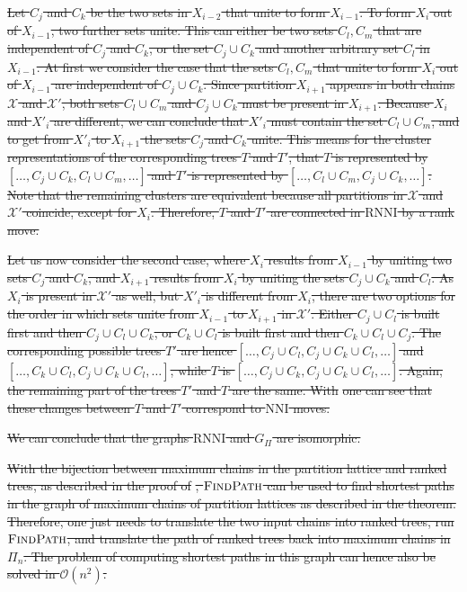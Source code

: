 \documentclass[11pt]{amsart}
\newcommand{\rnni}{\mathrm{RNNI}}
\newcommand{\findpath}{\textsc{FindPath}}
\newcommand{\nni}{\mathrm{NNI}}
\renewcommand{\O}{\mathcal O}
\providecommand{\DIFdeltex}[1]{{\protect\color{red}\sout{#1}}}                      %
\providecommand{\DIFdel}[1]{\texorpdfstring{\DIFdeltex{#1}}{}} %
\begin{document}
\DIFdel{Let $C_j$ and $C_k$ be the two sets in $X_{i-2}$ that unite to form $X_{i-1}$.
	To form $X_i$ out of $X_{i-1}$, two further sets unite.
	This can either be two sets $C_l, C_m$ that are independent of $C_j$ and $C_k$, or the set $C_j \cup C_k$ and another arbitrary set $C_l$ in $X_{i-1}$.
	At first we consider the case that the sets $C_l,C_m$ that unite to form $X_i$ out of $X_{i-1}$ are independent of $C_j \cup C_k$.
	Since partition $X_{i+1}$ appears in both chains $\mathcal X$ and $\mathcal X'$, both sets $C_l \cup C_m$ and $C_j \cup C_k$ must be present in $X_{i+1}$.
	Because $X_i$ and $X'_i$ are different, we can conclude that $X'_i$ must contain the set $C_l \cup C_m$, and to get from $X'_i$ to $X_{i+1}$ the sets $C_j$ and $C_k$ unite.
	This means for the cluster representations of the corresponding trees $T$ and $T'$, that $T$ is represented by $[\ldots, C_j \cup C_k, C_l \cup C_m, \ldots]$ and $T'$ is represented by $[\ldots, C_l \cup C_m, C_j \cup C_k, \ldots]$.
	Note that the remaining clusters are equivalent because all partitions in $\mathcal X$ and $\mathcal X'$ coincide, except for $X_i$.
	Therefore, $T$ and $T'$ are connected in $\rnni$ by a rank move.
}%

\DIFdel{Let us now consider the second case, where $X_i$ results from $X_{i-1}$ by uniting two sets $C_j$ and $C_k$, and $X_{i+1}$ results from $X_i$ by uniting the sets $C_j \cup C_k$ and $C_l$.
	As $X_i$ is present in $\mathcal X'$ as well, but $X'_i$ is different from $X_i$, there are two options for the order in which sets unite from $X_{i-1}$ to $X_{i+1}$ in $\mathcal X'$.
	Either $C_j \cup C_l$ is built first and then $C_j \cup C_l \cup C_k$, or $C_k \cup C_l$ is built first and then $C_k \cup C_l \cup C_j$.
	The corresponding possible trees $T'$ are hence $[\ldots, C_j \cup C_l, C_j \cup C_k \cup C_l, \ldots]$ and $[\ldots, C_k \cup C_l, C_j \cup C_k \cup C_l, \ldots]$, while $T$ is $[\ldots, C_j \cup C_k, C_j \cup C_k \cup C_l, \ldots]$.
	Again, the remaining part of the trees $T'$ and $T$ are the same.
	With }%
\DIFdel{one can see that these changes between $T$ and $T'$ correspond to $\nni$ moves.
}%

\DIFdel{We can conclude that the graphs $\rnni$ and $G_\Pi$ are isomorphic.
}%

\DIFdel{With the bijection between maximum chains in the partition lattice and ranked trees, as described in the proof of }%
\DIFdel{, $\findpath$ can be used to find shortest paths in the graph of maximum chains of partition lattices as described in the theorem.
Therefore, one just needs to translate the two input chains into ranked trees, run $\findpath$, and translate the path of ranked trees back into maximum chains in $\Pi_n$.
The problem of computing shortest paths in this graph can hence also be solved in $\O(n^2)$.
}%
\end{document}
